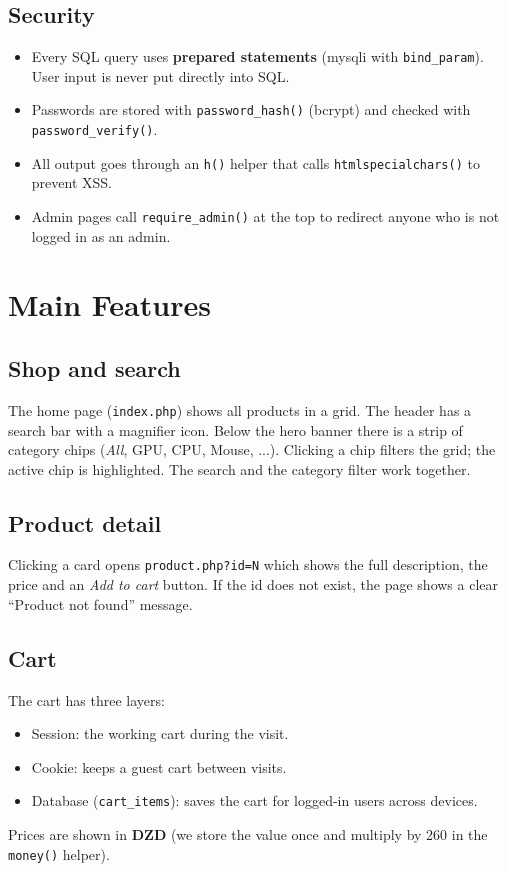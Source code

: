 \documentclass[11pt,a4paper]{article}
\begin{document}
\subsection{Security}
\begin{itemize}
    \item Every SQL query uses \textbf{prepared statements}
        (mysqli with \texttt{bind\_param}). User input is never put
        directly into SQL.
    \item Passwords are stored with \texttt{password\_hash()} (bcrypt)
        and checked with \texttt{password\_verify()}.
    \item All output goes through an \texttt{h()} helper that calls
        \texttt{htmlspecialchars()} to prevent XSS.
    \item Admin pages call \texttt{require\_admin()} at the top to
        redirect anyone who is not logged in as an admin.
\end{itemize}

\section{Main Features}

\subsection{Shop and search}
The home page (\texttt{index.php}) shows all products in a grid. The
header has a search bar with a magnifier icon. Below the hero banner
there is a strip of category chips (\textit{All}, GPU, CPU, Mouse, ...).
Clicking a chip filters the grid; the active chip is highlighted. The
search and the category filter work together.

\subsection{Product detail}
Clicking a card opens \texttt{product.php?id=N} which shows the full
description, the price and an \emph{Add to cart} button. If the id does
not exist, the page shows a clear ``Product not found'' message.

\subsection{Cart}
The cart has three layers:
\begin{itemize}
    \item Session: the working cart during the visit.
    \item Cookie: keeps a guest cart between visits.
    \item Database (\texttt{cart\_items}): saves the cart for logged-in
        users across devices.
\end{itemize}
Prices are shown in \textbf{DZD} (we store the value once and multiply by
260 in the \texttt{money()} helper).
\end{document}
